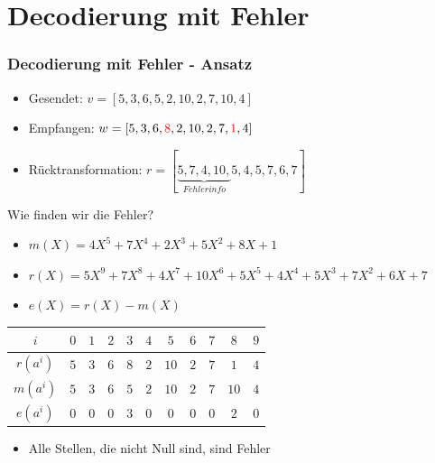 \documentclass[11pt,aspectratio=169]{beamer}
\begin{document}
\section{Decodierung mit Fehler}
	\begin{frame}
		\frametitle{Decodierung mit Fehler - Ansatz}	
		
		\begin{itemize}
			\item Gesendet: $v = [5,3,6,5,2,10,2,7,10,4]$
			
			\item Empfangen: $w = [5,3,6,\textcolor{red}{8},2,10,2,7,\textcolor{red}{1},4]$
			
			\item Rücktransformation: $r = [\underbrace{5,7,4,10,}_{Fehlerinfo}5,4,5,7,6,7]$
			
		\end{itemize}
		
		Wie finden wir die Fehler?
		
		\begin{itemize}
			\item $m(X) = 4X^5 + 7X^4 + 2X^3 + 5X^2 + 8X + 1$
			
			\item $r(X) = 5X^9 + 7X^8 + 4X^7 + 10X^6 + 5X^5 + 4X^4 + 5X^3 + 7X^2 + 6X + 7$
			
			\item $e(X) = r(X) - m(X)$
			
		\end{itemize}	

		\begin{center}

		\begin{tabular}{c c c c c c c c c c c}
			\hline
			$i$& $0$& $1$& $2$& $3$& $4$& $5$& $6$& $7$& $8$& $9$\\
			\hline
			$r(a^{i})$& $5$& $3$& $6$& $8$& $2$& $10$& $2$& $7$& $1$& $4$\\
			$m(a^{i})$& $5$& $3$& $6$& $5$& $2$& $10$& $2$& $7$& $10$& $4$\\
			$e(a^{i})$& $0$& $0$& $0$& $3$& $0$& $0$& $0$& $0$& $2$& $0$\\
			\hline
		\end{tabular}	

		\end{center}
		
		\begin{itemize}
			\item Alle Stellen, die nicht Null sind, sind Fehler
		\end{itemize}
		

	\end{frame}
\end{document}
